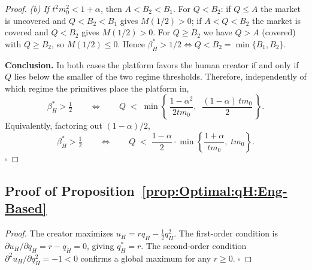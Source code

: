\begin{proof}
\emph{(b) If $t^2 m_0^2 < 1+\alpha$,} then $A < B_2 < B_1$. For $Q < B_2$: if $Q \le A$ the market is uncovered and $Q < B_2 < B_1$ gives $M(1/2) > 0$; if $A < Q < B_2$ the market is covered and $Q < B_2$ gives $M(1/2) > 0$. For $Q \ge B_2$ we have $Q > A$ (covered) with $Q \ge B_2$, so $M(1/2) \le 0$. Hence $\beta_H^* > 1/2 \iff Q < B_2 = \min\{B_1,B_2\}$.

\medskip
\textbf{Conclusion.} In both cases the platform favors the human creator if and only if $Q$ lies below the smaller of the two regime thresholds. Therefore, independently of which regime the primitives place the platform in,
\[
\beta_H^* > \tfrac{1}{2}
\qquad\Longleftrightarrow\qquad
Q \;<\; \min\!\left\{\,\frac{1-\alpha^2}{2tm_0},\;\; \frac{(1-\alpha)\,tm_0}{2}\,\right\}.
\]
Equivalently, factoring out $(1-\alpha)/2$,
\[
\beta_H^* > \tfrac{1}{2}
\qquad\Longleftrightarrow\qquad
Q \;<\; \frac{1-\alpha}{2}\cdot\min\!\left\{\frac{1+\alpha}{tm_0},\; tm_0\right\}. 
\]
\hfill $\square$
\end{proof}



\subsection*{Proof of Proposition~\ref{prop:Optimal:qH:Eng-Based}}
\begin{proof}
    The creator maximizes $u_H = rq_H - \frac{1}{2}q_H^2$. The first-order condition is $\partial u_H/\partial q_H = r - q_H = 0$, giving $q_H^* = r$. The second-order condition $\partial^2 u_H/\partial q_H^2 = -1 < 0$ confirms a global maximum for any $r \geq 0$.  \hfill$\square$
\end{proof}


